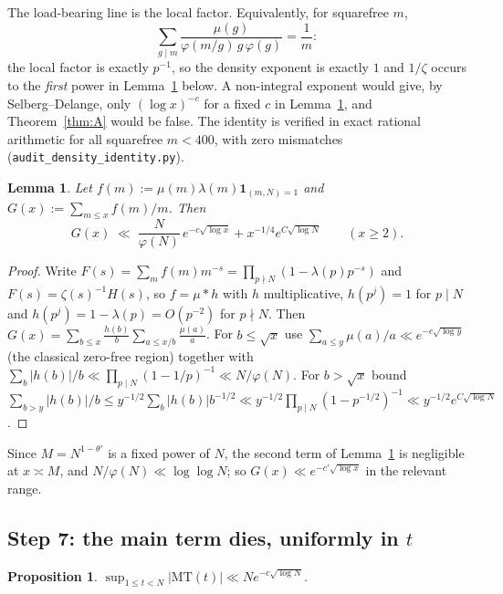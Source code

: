\documentclass[11pt,a4paper]{article}
\theoremstyle{plain}
\newtheorem{proposition}[theorem]{Proposition}
\newtheorem{lemma}[theorem]{Lemma}
\theoremstyle{definition}
\theoremstyle{remark}
\begin{document}
The load-bearing line is the local factor. Equivalently, for squarefree
$m$,
\[
  \sum_{g\mid m}\frac{\mu(g)}{\varphi(m/g)\,g\,\varphi(g)}=\frac1m :
\]
the local factor is exactly $p^{-1}$, so the density exponent is
exactly $1$ and $1/\zeta$ occurs to the \emph{first} power in
Lemma~\ref{lem:mu} below. A non-integral exponent would give, by
Selberg--Delange, only $(\log x)^{-c}$ for a fixed $c$ in
Lemma~\ref{lem:mu}, and Theorem~\ref{thm:A} would be false. The
identity is verified in exact rational arithmetic for all squarefree
$m<400$, with zero mismatches
(\texttt{audit\_density\_identity.py}).

\begin{lemma}\label{lem:mu}
Let $f(m):=\mu(m)\lambda(m)\mathbf 1_{(m,N)=1}$ and
$G(x):=\sum_{m\le x}f(m)/m$. Then
\[
  G(x)\;\ll\;\frac{N}{\varphi(N)}\,e^{-c\sqrt{\log x}}
   +x^{-1/4}e^{C\sqrt{\log N}}
   \qquad(x\ge2).
\]
\end{lemma}

\begin{proof}
Write $F(s)=\sum_m f(m)m^{-s}=\prod_{p\nmid N}(1-\lambda(p)p^{-s})$
and $F(s)=\zeta(s)^{-1}H(s)$, so $f=\mu*h$ with $h$ multiplicative,
$h(p^j)=1$ for $p\mid N$ and $h(p^j)=1-\lambda(p)=O(p^{-2})$ for
$p\nmid N$. Then
$G(x)=\sum_{b\le x}\frac{h(b)}{b}\sum_{a\le x/b}\frac{\mu(a)}{a}$. For
$b\le\sqrt x$ use $\sum_{a\le y}\mu(a)/a\ll e^{-c\sqrt{\log y}}$ (the
classical zero-free region) together with
$\sum_b|h(b)|/b\ll\prod_{p\mid N}(1-1/p)^{-1}\ll N/\varphi(N)$. For
$b>\sqrt x$ bound
$\sum_{b>y}|h(b)|/b\le y^{-1/2}\sum_b|h(b)|b^{-1/2}
\ll y^{-1/2}\prod_{p\mid N}(1-p^{-1/2})^{-1}\ll y^{-1/2}e^{C\sqrt{\log N}}$.
\end{proof}

Since $M=N^{1-\theta'}$ is a fixed power of $N$, the second term of
Lemma~\ref{lem:mu} is negligible at $x\asymp M$, and
$N/\varphi(N)\ll\log\log N$; so $G(x)\ll e^{-c'\sqrt{\log x}}$ in the
relevant range.

\subsection{Step 7: the main term dies, uniformly in
\texorpdfstring{$t$}{t}}

\begin{proposition}\label{prop:MT}
$\displaystyle\sup_{1\le t<N}|\mathrm{MT}(t)|\ll Ne^{-c\sqrt{\log N}}$.
\end{proposition}
\end{document}
